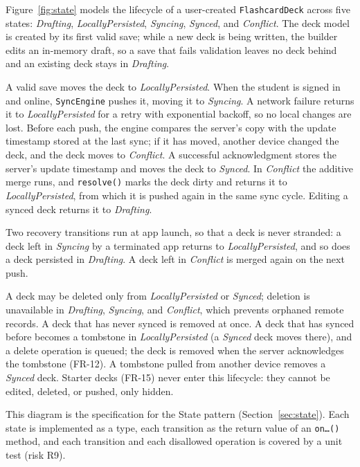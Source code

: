 \documentclass[12pt,letterpaper]{article}
\begin{document}
Figure~\ref{fig:state} models the lifecycle of a user-created \texttt{FlashcardDeck}
across five states: \emph{Drafting}, \emph{LocallyPersisted}, \emph{Syncing},
\emph{Synced}, and \emph{Conflict}. The deck model is created by its first valid save;
while a new deck is being written, the builder edits an in-memory draft, so a save that
fails validation leaves no deck behind and an existing deck stays in \emph{Drafting}.

A valid save moves the deck to \emph{LocallyPersisted}. When the student is signed in
and online, \texttt{SyncEngine} pushes it, moving it to \emph{Syncing}. A network
failure returns it to \emph{LocallyPersisted} for a retry with exponential backoff, so
no local changes are lost. Before each push, the engine compares the server's copy
with the update timestamp stored at the last sync; if it has moved, another device
changed the deck, and the deck moves to \emph{Conflict}. A successful acknowledgment
stores the server's update timestamp and moves the deck to \emph{Synced}. In \emph{Conflict} the additive merge runs, and \texttt{resolve()} marks the deck
dirty and returns it to \emph{LocallyPersisted}, from which it is pushed again in the
same sync cycle. Editing a synced deck returns it to \emph{Drafting}.

Two recovery transitions run at app launch, so that a deck is never stranded: a deck
left in \emph{Syncing} by a terminated app returns to \emph{LocallyPersisted}, and so
does a deck persisted in \emph{Drafting}. A deck left in \emph{Conflict} is merged
again on the next push.

A deck may be deleted only from \emph{LocallyPersisted} or \emph{Synced}; deletion is
unavailable in \emph{Drafting}, \emph{Syncing}, and \emph{Conflict}, which prevents
orphaned remote records. A deck that has never synced is removed at once. A deck that
has synced before becomes a tombstone in \emph{LocallyPersisted} (a \emph{Synced} deck
moves there), and a delete operation is queued; the deck is removed when the server
acknowledges the tombstone (FR-12). A tombstone pulled from another device removes a
\emph{Synced} deck. Starter decks (FR-15) never enter this lifecycle: they cannot be
edited, deleted, or pushed, only hidden.

This diagram is the specification for the State pattern (Section~\ref{sec:state}).
Each state is implemented as a type, each transition as the return value of an
\texttt{on\ldots()} method, and each transition and each disallowed operation is
covered by a unit test (risk R9).
\end{document}
